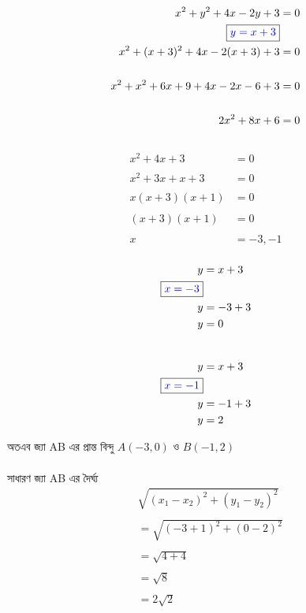 \documentclass{article}
\begin{document}
			\begin{align*}
			x^2+y^2+4x-2y+3&=0\\
			\boxed{\textcolor{blue}{y=x+3}}&\\
			x^2+(x+3)^2+4x-2(x+3)+3&=0\\
			\\
			x^2+x^2+6x+9+4x-2x-6+3&=0\\
			\\
			2x^2+8x+6&=0\\
		\end{align*}
		\\
		\begin{align*}
			x^2+4x+3&=0\\
			\\
			x^2+3x+x+3&=0\\
			\\
			x(x+3)(x+1)&=0\\
			\\
			(x+3)(x+1)&=0\\
			\\
			x&=-3,-1\\
		\end{align*}
	\begin{multicols}{2}
		\begin{align*}
			y&=x+3\\
			\boxed{\textcolor{blue}{x=-3}}&\\
			y&=-3+3\\
			y&=0\\
		\end{align*}
		\\
		\begin{align*}
			y&=x+3\\
			\boxed{\textcolor{blue}{x=-1}}&\\
			y&=-1+3\\
			y&=2\\
		\end{align*}
	\end{multicols}
	অতএব জ্যা AB এর  প্রান্ত বিন্দু $A(-3,0)$  ও $B(-1,2)$\\ 
\\ 
সাধারণ জ্যা AB এর  দৈর্ঘ্য \\ 
	\begin{align*}
		&\sqrt{(x_1-x_2)^2+(y_1-y_2)^2}\\
		\\
		&=\sqrt{(-3+1)^2+(0-2)^2}\\
		\\
		&=\sqrt{4+4}\\
		\\
		&=\sqrt{8}\\
		\\
		&=2\sqrt{2}\\
	\end{align*}
\end{document}
